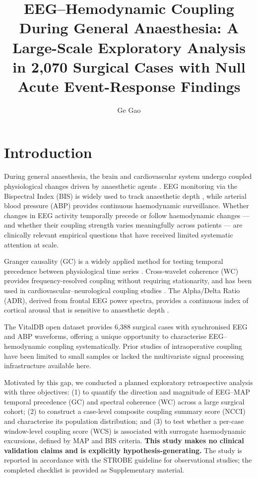 \documentclass[fleqn,10pt,lineno]{wlpeerj}
\title{EEG--Hemodynamic Coupling During General Anaesthesia:
A Large-Scale Exploratory Analysis in 2,070 Surgical Cases
with Null Acute Event-Response Findings}
\author[1]{Ge Gao}
\affil[1]{Department of Anesthesiology, The First Affiliated Hospital,
Zhejiang University School of Medicine, Hangzhou, China}
\affil[ ]{\textit{Corresponding author:} Ge Gao, gaoge2018@zju.edu.cn}
\begin{document}
\flushbottom
\maketitle
\thispagestyle{empty}

\section{Introduction}

During general anaesthesia, the brain and cardiovascular system undergo coupled physiological
changes driven by anaesthetic agents \citep{brown2010,purdon2015}. EEG monitoring via the
Bispectral Index (BIS) is widely used to track anaesthetic depth \citep{avidan2008}, while
arterial blood pressure (ABP) provides continuous haemodynamic surveillance. Whether changes
in EEG activity temporally precede or follow haemodynamic changes --- and whether their
coupling strength varies meaningfully across patients --- are clinically relevant empirical
questions that have received limited systematic attention at scale.

Granger causality (GC) \citep{granger1969} is a widely applied method for testing temporal
precedence between physiological time series \citep{pereda2005,seth2015}. Cross-wavelet
coherence (WC) \citep{torrence1998} provides frequency-resolved coupling without requiring
stationarity, and has been used in cardiovascular--neurological coupling studies
\citep{pikovsky2001}. The Alpha/Delta Ratio (ADR), derived from frontal EEG power spectra,
provides a continuous index of cortical arousal that is sensitive to anaesthetic depth
\citep{akeju2014,bruhn2000}.

The VitalDB open dataset \citep{lee2022} provides 6,388 surgical cases with synchronised EEG
and ABP waveforms, offering a unique opportunity to characterise EEG--hemodynamic coupling
systematically. Prior studies of intraoperative coupling have been limited to small samples
or lacked the multivariate signal processing infrastructure available here.

Motivated by this gap, we conducted a planned exploratory retrospective analysis with
three objectives: (1) to quantify the direction and magnitude of EEG--MAP temporal precedence
(GC) and spectral coherence (WC) across a large surgical cohort; (2) to construct a case-level
composite coupling summary score (NCCI) and characterise its population distribution; and
(3) to test whether a per-case window-level coupling score (WCS) is associated with surrogate
haemodynamic excursions, defined by MAP and BIS criteria. \textbf{This study makes no clinical
validation claims and is explicitly hypothesis-generating.} The study is reported in accordance
with the STROBE guideline for observational studies; the completed checklist is provided as
Supplementary material.
\end{document}
